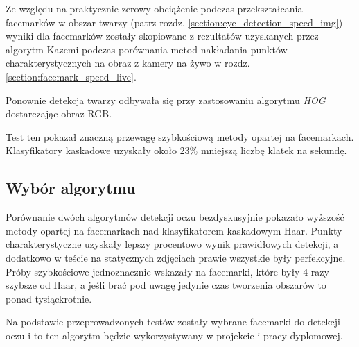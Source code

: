 Ze względu na praktycznie zerowy obciążenie podczas przekształcania facemarków w obszar twarzy (patrz rozdz. \hyperref[{section:eye_detection_speed_img}]{\ref{section:eye_detection_speed_img}}) wyniki dla facemarków zostały skopiowane z rezultatów uzyskanych przez algorytm Kazemi podczas porównania metod nakładania punktów charakterystycznych na obraz z kamery na żywo  w rozdz. \hyperref[{section:facemark_speed_live}]{\ref{section:facemark_speed_live}}.
\par
Ponownie detekcja twarzy odbywała się przy zastosowaniu algorytmu \textit{HOG} dostarczając obraz RGB.



Test ten pokazał znaczną przewagę szybkościową metody opartej na facemarkach. Klasyfikatory kaskadowe uzyskały około $23\%$ mniejszą liczbę klatek na sekundę.



\subsection{Wybór algorytmu}

Porównanie dwóch algorytmów detekcji oczu bezdyskusyjnie pokazało wyższość metody opartej na facemarkach nad klasyfikatorem kaskadowym Haar. Punkty charakterystyczne uzyskały lepszy procentowo wynik prawidłowych detekcji, a dodatkowo w teście na statycznych zdjęciach prawie wszystkie były perfekcyjne. Próby szybkościowe jednoznacznie wskazały na facemarki, które były $4$ razy szybsze od Haar, a jeśli brać pod uwagę jedynie czas tworzenia obszarów to ponad tysiąckrotnie.
\par
Na podstawie przeprowadzonych testów zostały wybrane facemarki do detekcji oczu i to ten algorytm będzie wykorzystywany w projekcie i pracy dyplomowej.